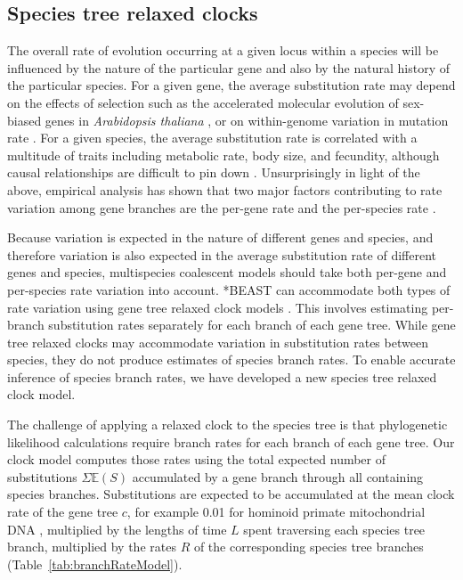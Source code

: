 \documentclass[12pt]{article}
\begin{document}
\subsection{Species tree relaxed clocks}

The overall rate of evolution occurring at a given locus within a species will
be influenced by the nature of the particular gene and also by the natural
history of the particular species. For a given gene, the average substitution
rate may depend on the effects of selection such as the accelerated molecular
evolution of sex-biased genes in \textit{Arabidopsis thaliana}
\citep{Gossmann01032014}, or on within-genome variation in mutation rate \citep{Baer2007}.
For a given species, the average substitution rate is correlated with a
multitude of traits including metabolic rate, body size, and fecundity, although
causal relationships are difficult to pin down \citep{Bromham2503}.
Unsurprisingly in light of the above, empirical analysis has shown that two
major factors contributing to rate variation among gene branches are the
per-gene rate and the per-species rate \citep{Rasmussen01122007}.

Because variation is expected in the nature of different genes and species, and
therefore variation is also expected in the average substitution rate of different
genes and species, multispecies coalescent models should take both per-gene and
per-species rate variation into account. *BEAST can accommodate both types of
rate variation using gene tree relaxed clock models \citep[for examples see][]{Berv2014120, Lambert2015146}.
This involves estimating per-branch substitution rates separately
for each branch of each gene tree. While gene tree relaxed clocks may
accommodate variation in substitution rates between species, they do not produce
estimates of species branch rates. To enable accurate inference of species
branch rates, we have developed a new species tree relaxed clock model.

The challenge of applying a relaxed clock to the species tree is that
phylogenetic likelihood calculations require branch rates for each branch of
each gene tree. Our clock model computes those rates using the total expected number of substitutions
$\Sigma \mathbb{E}(S)$ accumulated by a gene branch through all containing
species branches. Substitutions are expected to be accumulated at the mean
clock rate of the gene tree $c$, for example 0.01 for hominoid primate
mitochondrial DNA \citep{doi:10.1146/annurev.es.18.110187.001413}, multiplied
by the lengths of time $L$ spent traversing each species tree branch, multiplied
by the rates $R$ of the corresponding species tree branches
(Table~\ref{tab:branchRateModel}).
\end{document}
